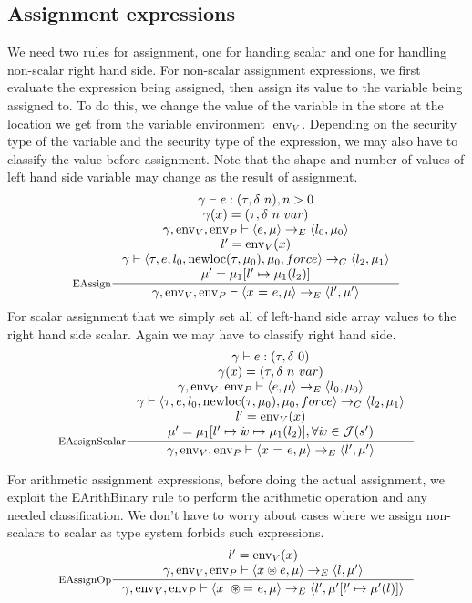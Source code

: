 \documentclass[a4paper, 10pt, draft]{report}
\DeclareMathOperator*{\env}{env}
\DeclareMathOperator*{\newloc}{newloc}
\newcommand{\mycode}[1]{\ensuremath{\mbox{\lstinline{#1}}}}
\newcommand{\anyop}{\ensuremath{\circledast}}
\begin{document}
\subsection{Assignment expressions}\label{sec:semantics:expr:assign}

We need two rules for assignment, one for handing scalar and one for handling
non-scalar right hand side.  For non-scalar assignment expressions, we first
evaluate the expression being assigned, then assign its value to the variable
being assigned to.  To do this, we change the value of the variable in the
store at the location we get from the variable environment
$\operatorname{env}_V$. Depending on the security type of the variable and the
security type of the expression, we may also have to classify the value before
assignment. Note that the shape and number of values of left hand side variable
may change as the result of assignment.
\[\inference[EAssign]
{
  \gamma |- e : (\tau, \delta\ n), n > 0 \\
  \gamma(x) = (\tau, \delta\ n\ var) \\
  \gamma, \env_V, \env_P |- \left< e, \mu \right> \to_E \left< l_0, \mu_0 \right> \\
  l' = \env_V(x) \\
  \gamma |- \left< \tau, e, l_0, \newloc(\tau, \mu_0), \mu_0, force \right> \to_C \left<l_2, \mu_1 \right> \\
  \mu' = \mu_1[l' \mapsto \mu_1(l_2)]
}{
  \gamma, \env_V, \env_P |- \left< x\ \mycode{=}\ e, \mu \right> \to_E \left< l', \mu' \right>
}\]
For scalar assignment that we simply set all of left-hand side array values to
the right hand side scalar. Again we may have to classify right hand side.
\[\inference[EAssignScalar]
{
  \gamma |- e : (\tau, \delta\ 0) \\
  \gamma(x) = (\tau, \delta\ n\ var) \\
  \gamma, \env_V, \env_P |- \left< e, \mu \right> \to_E \left< l_0, \mu_0 \right> \\
  \gamma |- \left< \tau, e, l_0, \newloc(\tau, \mu_0), \mu_0, force \right> \to_C \left<l_2, \mu_1 \right> \\
  l' = \env_V(x) \\
  \mu' = \mu_1[l' \mapsto i\!v \mapsto \mu_1(l_2)], \forall i\!v \in \mathcal{J}(s')
}{
  \gamma, \env_V, \env_P |- \left< x\ \mycode{=}\ e, \mu \right> \to_E \left< l', \mu' \right>
}\]

For arithmetic assignment expressions, before doing the actual assignment, we
exploit the EArithBinary rule to perform the arithmetic operation and any
needed classification. We don't have to worry about cases where we assign
non-scalars to scalar as type system forbids such expressions.
\[\inference[EAssignOp]
{
  l' = \env_V(x) \\
  \gamma, \env_V, \env_P |- \left< x \anyop e, \mu \right> \to_E \left< l, \mu' \right>
}{
  \gamma, \env_V, \env_P |- \left< x\ \anyop \mycode{=}\ e, \mu \right> \to_E \left< l', \mu'[l' \mapsto \mu'(l)] \right>
}\]
\end{document}
